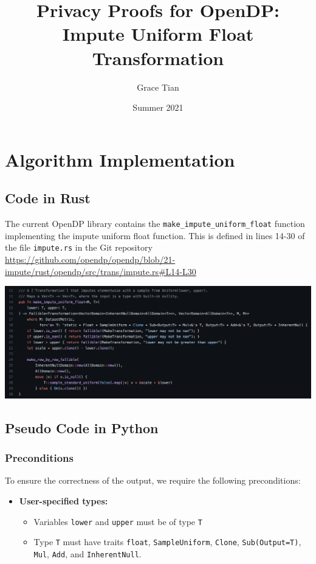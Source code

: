 \documentclass[11pt,a4paper]{article}
\title{Privacy Proofs for OpenDP: Impute Uniform Float Transformation}
\author{Grace Tian}
\date{Summer 2021}
\newcommand{\T}{\texttt{T} }
\begin{document}
\maketitle
\tableofcontents

\section{Algorithm Implementation}
\subsection{Code in Rust}

The current OpenDP library contains the \texttt{make\_impute\_uniform\_float} function implementing the impute uniform float function. This is defined in lines 14-30 of the file \texttt{impute.rs} in the Git repository \url{https://github.com/opendp/opendp/blob/21-impute/rust/opendp/src/trans/impute.rs#L14-L30}



\includegraphics[width=\textwidth]{make_impute_unif_float.png}


\subsection{Pseudo Code in Python}

\subsubsection*{Preconditions}
To ensure the correctness of the output, we require the following preconditions:

\begin{itemize}
    \item \textbf{User-specified types:}
    \begin{itemize}
        \item Variables \texttt{lower} and \texttt{upper} must be of type \T
        \item Type \texttt{T} must have traits \texttt{float}, \texttt{SampleUniform}, \texttt{Clone}, \texttt{Sub(Output=T)}, \texttt{Mul}, \texttt{Add}, and \texttt{InherentNull}.
    \end{itemize}
\end{itemize}
\end{document}
